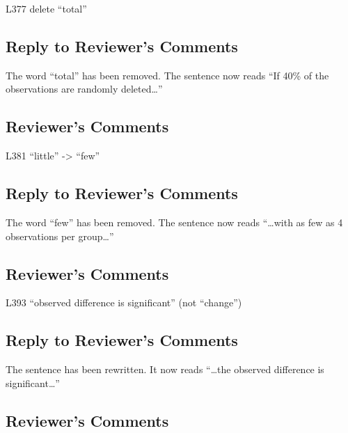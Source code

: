 \documentclass[
]{article}
\begin{document}
L377 delete ``total''

\hypertarget{section-33}{%
\subsection{\texorpdfstring{\textcolor{reviewersblue} {Reply to Reviewer's Comments}}{}}\label{section-33}}

The word ``total'' has been removed. The sentence now reads ``If 40\% of the observations are randomly deleted\ldots{}''

\hypertarget{reviewers-comments-33}{%
\subsection{Reviewer's Comments}\label{reviewers-comments-33}}

L381 ``little'' -\textgreater{} ``few''

\hypertarget{section-34}{%
\subsection{\texorpdfstring{\textcolor{reviewersblue} {Reply to Reviewer's Comments}}{}}\label{section-34}}

The word ``few'' has been removed. The sentence now reads ``\ldots with as few as 4 observations per group\ldots{}''

\hypertarget{reviewers-comments-34}{%
\subsection{Reviewer's Comments}\label{reviewers-comments-34}}

L393 ``observed difference is significant'' (not ``change'')

\hypertarget{section-35}{%
\subsection{\texorpdfstring{\textcolor{reviewersblue} {Reply to Reviewer's Comments}}{}}\label{section-35}}

The sentence has been rewritten. It now reads ``\ldots the observed difference is significant\ldots{}''

\hypertarget{reviewers-comments-35}{%
\subsection{Reviewer's Comments}\label{reviewers-comments-35}}
\end{document}
